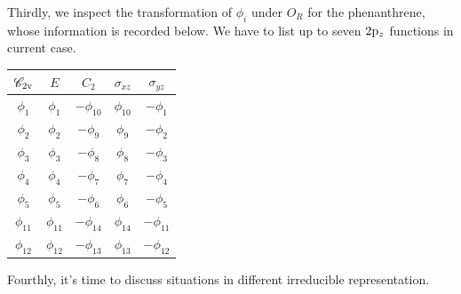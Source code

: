 		Thirdly, we inspect the transformation of $\phi_i$ under $O_R$ for the phenanthrene, whose information is recorded below. We have to list up to seven $2 {\rm p}_z$ functions in current case.
		\begin{center}
		\setlength{\abovecaptionskip}{0em}
		\begin{tabular}{ccccc}\hline
	$\mathscr{C}_{\rm 2v}$ & $E$ & $C_2$ &	$\sigma_{xz}$	& $\sigma_{yz}$	\\ \hline
			$\phi_1$	&	$\phi_1$	&	$-\phi_{10}$	&	$\phi_{10}$	&	$-\phi_1$	\\
			$\phi_2$	&	$\phi_2$	&	$-\phi_9$	&	$\phi_9$	&	$-\phi_2$		\\
			$\phi_3$	&	$\phi_3$	&	$-\phi_8$	&	$\phi_8$	&	$-\phi_3$		\\
			$\phi_4$	&	$\phi_4$	&	$-\phi_7$	&	$\phi_7$	&	$-\phi_4$		\\ 
			$\phi_5$	&	$\phi_5$	&	$-\phi_6$	&	$\phi_6$	&	$-\phi_5$		\\ 
			$\phi_{11}$	&	$\phi_{11}$	&	$-\phi_{14}$	&	$\phi_{14}$	&	$-\phi_{11}$		\\
			$\phi_{12}$	&	$\phi_{12}$	&	$-\phi_{13}$	&	$\phi_{13}$	&	$-\phi_{12}$		\\ \hline
		\end{tabular}
		\end{center}
		
		Fourthly, it's time to discuss situations in different irreducible representation. 
		
